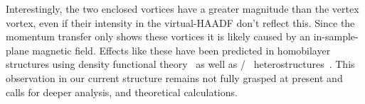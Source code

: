 %
Interestingly, the two enclosed vortices have a greater magnitude than the vertex vortex, even if their intensity in the virtual-HAADF don't reflect this. 
%
Since the momentum transfer only shows these vortices it is likely caused by an in-sample-plane magnetic field.
%
Effects like these have been predicted in homobilayer  structures using density functional theory~\cite{wuTopologicalInsulatorsTwisted2019} as well as /~ heterostructures~\cite{zhangSpintexturedChernBands2021}.
%
This observation in our current  structure remains not fully grasped at present and calls for deeper analysis, and theoretical calculations.

